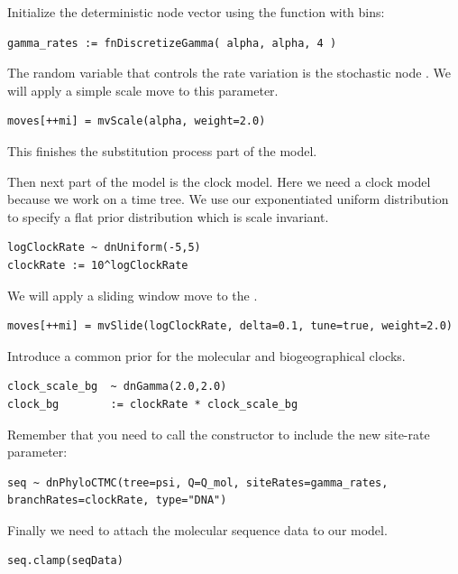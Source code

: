 Initialize the  deterministic node vector using the   function with  bins:
{\tt \begin{snugshade*}
\begin{lstlisting}
gamma_rates := fnDiscretizeGamma( alpha, alpha, 4 )
\end{lstlisting}
\end{snugshade*}}
The random variable that controls the rate variation is the stochastic node . 
We will apply a simple scale move to this parameter.
{\tt \begin{snugshade*}
\begin{lstlisting}
moves[++mi] = mvScale(alpha, weight=2.0)
\end{lstlisting}
\end{snugshade*}}
This finishes the substitution process part of the model.

Then next part of the model is the clock model. Here we need a clock model because we work on a time tree. We use our exponentiated uniform distribution to specify a flat prior distribution which is scale invariant.
{\tt \begin{snugshade*}
\begin{lstlisting}
logClockRate ~ dnUniform(-5,5)
clockRate := 10^logClockRate
\end{lstlisting}
\end{snugshade*}}
We will apply a sliding window move to the .
{\tt \begin{snugshade*}
\begin{lstlisting}
moves[++mi] = mvSlide(logClockRate, delta=0.1, tune=true, weight=2.0)
\end{lstlisting}
\end{snugshade*}}

Introduce a common prior for the molecular and biogeographical clocks.
\begin{snugshade}
\begin{lstlisting}
clock_scale_bg  ~ dnGamma(2.0,2.0)
clock_bg        := clockRate * clock_scale_bg
\end{lstlisting}
\end{snugshade}

Remember that you need to call the  constructor to include the new site-rate parameter:
{\tt \begin{snugshade*}
\begin{lstlisting}
seq ~ dnPhyloCTMC(tree=psi, Q=Q_mol, siteRates=gamma_rates, branchRates=clockRate, type="DNA")
\end{lstlisting}
\end{snugshade*}}
Finally we need to attach the molecular sequence data to our model.
{\tt \begin{snugshade*}
\begin{lstlisting}
seq.clamp(seqData)
\end{lstlisting}
\end{snugshade*}}

